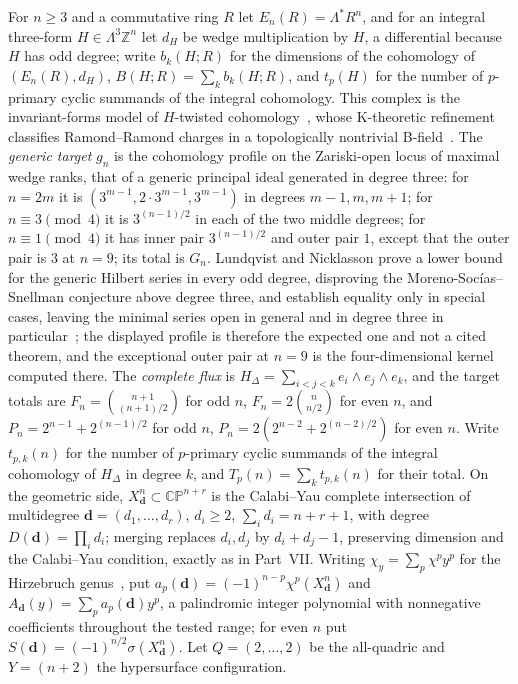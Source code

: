\documentclass[11pt]{article}
\theoremstyle{definition}
\newcommand{\Z}{\mathbb Z}
\providecommand{\Z}{\mathbb Z}
\begin{document}
For $n\ge3$ and a commutative ring $R$ let $E_n(R)=\Lambda^{*}R^n$, and for an integral three-form $H\in\Lambda^3\Z^n$ let $d_H$ be wedge multiplication by $H$, a differential because $H$ has odd degree; write $b_k(H;R)$ for the dimensions of the cohomology of $(E_n(R),d_H)$, $B(H;R)=\sum_kb_k(H;R)$, and $t_p(H)$ for the number of $p$-primary cyclic summands of the integral cohomology.  This complex is the invariant-forms model of $H$-twisted cohomology~\cite{Cav04}, whose K-theoretic refinement classifies Ramond--Ramond charges in a topologically nontrivial B-field~\cite{BM00}.  The \emph{generic target} $g_n$ is the cohomology profile on the Zariski-open locus of maximal wedge ranks, that of a generic principal ideal generated in degree three: for $n=2m$ it is $(3^{m-1},2\cdot3^{m-1},3^{m-1})$ in degrees $m-1,m,m+1$; for $n\equiv3\pmod4$ it is $3^{(n-1)/2}$ in each of the two middle degrees; for $n\equiv1\pmod4$ it has inner pair $3^{(n-1)/2}$ and outer pair $1$, except that the outer pair is $3$ at $n=9$; its total is $G_n$.  Lundqvist and Nicklasson prove a lower bound for the generic Hilbert series in every odd degree, disproving the Moreno-Soc\'ias--Snellman conjecture above degree three, and establish equality only in special cases, leaving the minimal series open in general and in degree three in particular~\cite{LN19}; the displayed profile is therefore the expected one and not a cited theorem, and the exceptional outer pair at $n=9$ is the four-dimensional kernel computed there.  The \emph{complete flux} is $H_\Delta=\sum_{i<j<k}e_i\wedge e_j\wedge e_k$, and the target totals are $F_n=\binom{n+1}{(n+1)/2}$ for odd $n$, $F_n=2\binom{n}{n/2}$ for even $n$, and $P_n=2^{n-1}+2^{(n-1)/2}$ for odd $n$, $P_n=2(2^{n-2}+2^{(n-2)/2})$ for even $n$.  Write $t_{p,k}(n)$ for the number of $p$-primary cyclic summands of the integral cohomology of $H_\Delta$ in degree $k$, and $T_p(n)=\sum_kt_{p,k}(n)$ for their total.  On the geometric side, $X^n_{\mathbf d}\subset\mathbb{CP}^{n+r}$ is the Calabi--Yau complete intersection of multidegree $\mathbf d=(d_1,\ldots,d_r)$, $d_i\ge2$, $\sum_id_i=n+r+1$, with degree $D(\mathbf d)=\prod_id_i$; merging replaces $d_i,d_j$ by $d_i+d_j-1$, preserving dimension and the Calabi--Yau condition, exactly as in Part~VII.  Writing $\chi_y=\sum_p\chi^py^p$ for the Hirzebruch genus~\cite{Hir66}, put $a_p(\mathbf d)=(-1)^{n-p}\chi^p(X^n_{\mathbf d})$ and $A_{\mathbf d}(y)=\sum_pa_p(\mathbf d)y^p$, a palindromic integer polynomial with nonnegative coefficients throughout the tested range; for even $n$ put $S(\mathbf d)=(-1)^{n/2}\sigma(X^n_{\mathbf d})$.  Let $Q=(2,\ldots,2)$ be the all-quadric and $Y=(n+2)$ the hypersurface configuration.
\end{document}
